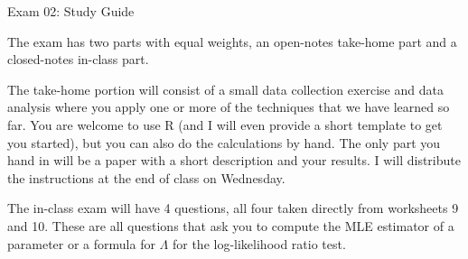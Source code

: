 \documentclass{tufte-handout}
\begin{document}
\justify

{\LARGE Exam 02: Study Guide}

\vspace*{18pt}

\noindent
The exam has two parts with equal weights, an open-notes
take-home part and a closed-notes in-class part.

\vspace*{18pt}

\noindent
The take-home
portion will consist of a small data collection exercise and
data analysis where you apply one or more of the techniques that
we have learned so far. You are welcome to use R (and I will 
even provide a short template to get you started), but you
can also do the calculations by hand. The only part you hand
in will be a paper with a short description and your results.
I will distribute the instructions at the end of class on Wednesday.

\vspace*{18pt}

\noindent
The in-class exam will have 4 questions, all four taken directly
from worksheets 9 and 10. These are all questions that ask you
to compute the MLE estimator of a parameter or a formula for
$\Lambda$ for the log-likelihood ratio test.
\end{document}
